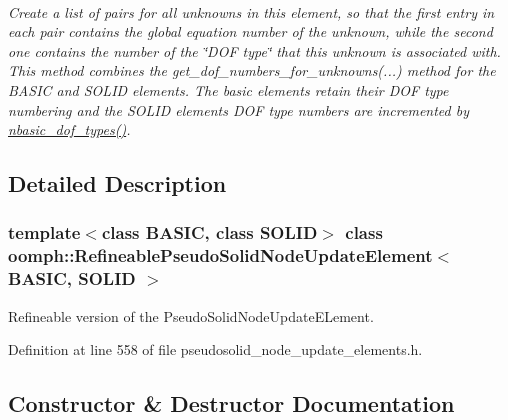 \begin{DoxyCompactItemize}
$$\begin{DoxyCompactList}\small\item\em Create a list of pairs for all unknowns in this element, so that the first entry in each pair contains the global equation number of the unknown, while the second one contains the number of the \char`\"{}\+D\+O\+F type\char`\"{} that this unknown is associated with. This method combines the get\+\_\+dof\+\_\+numbers\+\_\+for\+\_\+unknowns(...) method for the B\+A\+S\+IC and S\+O\+L\+ID elements. The basic elements retain their D\+OF type numbering and the S\+O\+L\+ID elements D\+OF type numbers are incremented by \hyperlink{classoomph_1_1RefineablePseudoSolidNodeUpdateElement_a029f632bdb246c67eb49b7803fd40ab1}{nbasic\+\_\+dof\+\_\+types()}. \end{DoxyCompactList}\end{DoxyCompactItemize}


\subsection{Detailed Description}
\subsubsection*{template$<$class B\+A\+S\+IC, class S\+O\+L\+ID$>$\newline
class oomph\+::\+Refineable\+Pseudo\+Solid\+Node\+Update\+Element$<$ B\+A\+S\+I\+C, S\+O\+L\+I\+D $>$}

Refineable version of the Pseudo\+Solid\+Node\+Update\+E\+Lement. 

Definition at line 558 of file pseudosolid\+\_\+node\+\_\+update\+\_\+elements.\+h.



\subsection{Constructor \& Destructor Documentation}
\mbox{\label{classoomph_1_1RefineablePseudoSolidNodeUpdateElement_a5d066a14376949c5a0d598ad2edbf179}} 
